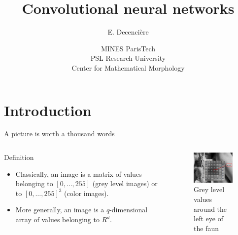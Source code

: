 \documentclass[xcolor=pdftex,dvipsnames,table,mathserif]{beamer}
\title{Convolutional neural networks}
\author{E. Decencière}
\date{MINES ParisTech\\
  PSL Research University\\
  Center for Mathematical Morphology
}
\begin{document}
\begin{frame}
  \titlepage
\end{frame}



\section{Introduction}

\begin{frame}{A picture is worth a thousand words}

  \begin{columns}
    \begin{column}{.5\textwidth}
      \begin{block}{Definition}
        \begin{itemize}
        \item Classically, an image is a matrix of values belonging to $[0, \ldots, 255]$ (grey level images) or to $[0, \ldots, 255]^3$ (color images).
        \item More generally, an image is a $q$-dimensional array of values belonging to $R^d$.
        \end{itemize}
      \end{block}

    \end{column}

    \begin{column}{.5\textwidth}
      \begin{figure}
        \centering
        \includegraphics[width=5cm]{../graphics/faune.png}\\
        \tiny{Grey level values around the left eye of the faun}
      \end{figure}

    \end{column}
  \end{columns}

\end{frame}
\end{document}
